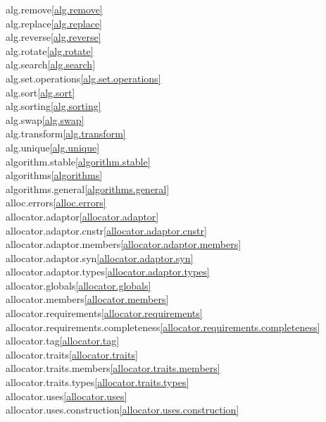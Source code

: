 \begin{multicols}{2}
alg.remove\quad\ref{alg.remove}\\
alg.replace\quad\ref{alg.replace}\\
alg.reverse\quad\ref{alg.reverse}\\
alg.rotate\quad\ref{alg.rotate}\\
alg.search\quad\ref{alg.search}\\
alg.set.operations\quad\ref{alg.set.operations}\\
alg.sort\quad\ref{alg.sort}\\
alg.sorting\quad\ref{alg.sorting}\\
alg.swap\quad\ref{alg.swap}\\
alg.transform\quad\ref{alg.transform}\\
alg.unique\quad\ref{alg.unique}\\
algorithm.stable\quad\ref{algorithm.stable}\\
algorithms\quad\ref{algorithms}\\
algorithms.general\quad\ref{algorithms.general}\\
alloc.errors\quad\ref{alloc.errors}\\
allocator.adaptor\quad\ref{allocator.adaptor}\\
allocator.adaptor.cnstr\quad\ref{allocator.adaptor.cnstr}\\
allocator.adaptor.members\quad\ref{allocator.adaptor.members}\\
allocator.adaptor.syn\quad\ref{allocator.adaptor.syn}\\
allocator.adaptor.types\quad\ref{allocator.adaptor.types}\\
allocator.globals\quad\ref{allocator.globals}\\
allocator.members\quad\ref{allocator.members}\\
allocator.requirements\quad\ref{allocator.requirements}\\
allocator.requirements.completeness\quad\ref{allocator.requirements.completeness}\\
allocator.tag\quad\ref{allocator.tag}\\
allocator.traits\quad\ref{allocator.traits}\\
allocator.traits.members\quad\ref{allocator.traits.members}\\
allocator.traits.types\quad\ref{allocator.traits.types}\\
allocator.uses\quad\ref{allocator.uses}\\
allocator.uses.construction\quad\ref{allocator.uses.construction}\\

\end{multicols}
